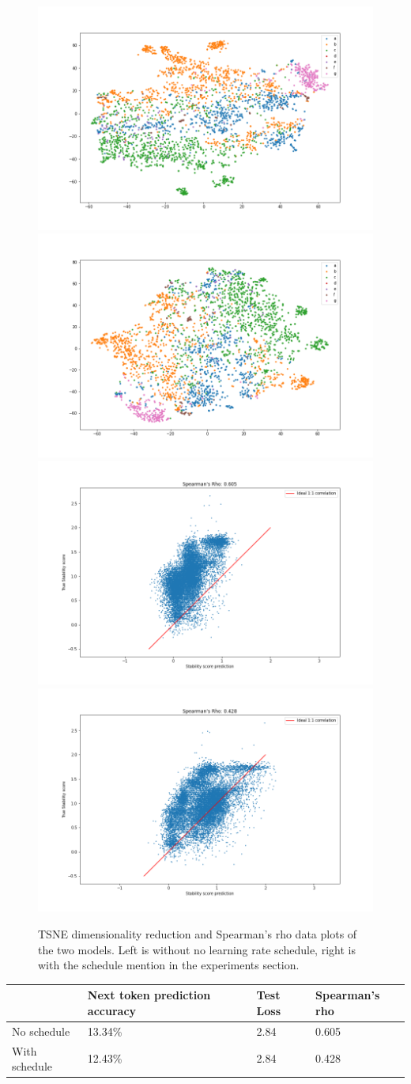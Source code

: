 \begin{figure}[!ht]
  \centering
  \includegraphics[width=0.49\linewidth]{latex/imgs/tsne_1_layer_no_schedule_512_final.png}
  \includegraphics[width=0.49\linewidth]{latex/imgs/tsne_1_layer_with_schedule_512_final.png}
  \includegraphics[width=0.49\linewidth]{latex/imgs/spearman_1_layer_no_schedule_512_final.png}
  \includegraphics[width=0.49\linewidth]{latex/imgs/spearman_1_layer_with_schedule_512_final.png}
  \caption{TSNE dimensionality reduction  and Spearman's rho data plots of the two models. Left is without no learning rate schedule, right is with the schedule mention in the experiments section.}
\end{figure}

\begin{table}[!ht]
\begin{tabular}{|l|l|l|l|}
\hline
              & Next token prediction accuracy & Test Loss & Spearman's rho\\ \hline
No schedule   & 13.34\%                        & 2.84      & 0.605         \\ \hline
With schedule & 12.43\%                        & 2.84      & 0.428         \\ \hline
\end{tabular}
\end{table}
